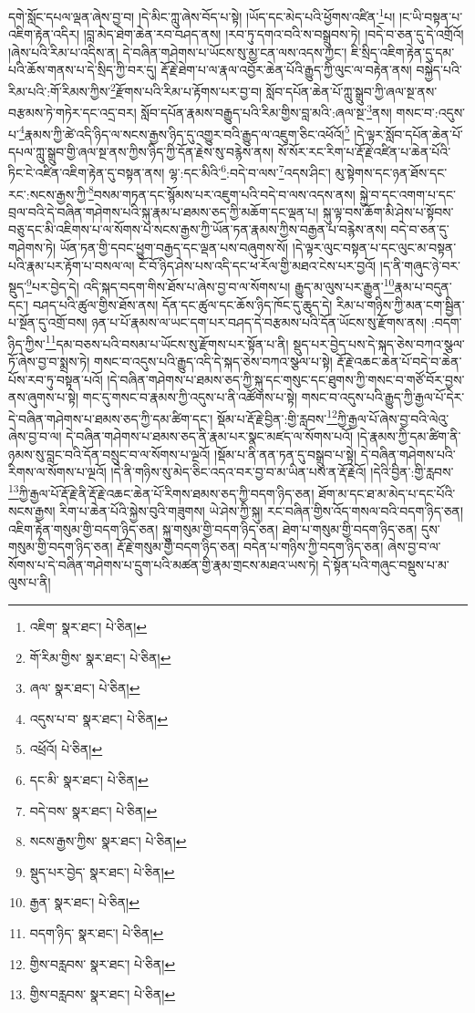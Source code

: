 དགེ་སློང་དཔལ་ལྡན་ཞེས་བྱ་བ། །དེ་མིང་ཀླུ་ཞེས་བོད་པ་སྟེ། །ཡོད་དང་མེད་པའི་ཕྱོགས་འཛིན་\footnote{འཇིག་  སྣར་ཐང་།  པེ་ཅིན། }པ། །ང་ཡི་བསྟན་པ་འཇིག་རྟེན་འདིར། །བླ་མེད་ཐེག་ཆེན་རབ་བཤད་ནས། །རབ་ཏུ་དགའ་བའི་ས་བསྒྲུབས་ཏེ། །བདེ་བ་ཅན་དུ་དེ་འགྲོའོ། །ཞེས་པའི་རིམ་པ་འདིས་ན། དེ་བཞིན་གཤེགས་པ་ཡོངས་སུ་མྱ་ངན་ལས་འདས་ཀྱང་། ཇི་སྲིད་འཇིག་རྟེན་དུ་དམ་པའི་ཆོས་གནས་པ་དེ་སྲིད་ཀྱི་བར་དུ། རྡོ་རྗེ་ཐེག་པ་ལ་རྣལ་འབྱོར་ཆེན་པོའི་རྒྱུད་ཀྱི་ལུང་ལ་བརྟེན་ནས། བསྐྱེད་པའི་རིམ་པའི་:གོ་རིམས་ཀྱིས་\footnote{གོ་རིམ་གྱིས་  སྣར་ཐང་།  པེ་ཅིན། }རྫོགས་པའི་རིམ་པ་རྟོགས་པར་བྱ་བ། སློབ་དཔོན་ཆེན་པོ་ཀླུ་སྒྲུབ་ཀྱི་ཞལ་སྔ་ནས་བརྩམས་ཏེ་གཏེར་དང་འདྲ་བར། སློབ་དཔོན་རྣམས་བརྒྱུད་པའི་རིམ་གྱིས་བླ་མའི་:ཞལ་སྔ་\footnote{ཞལ་  སྣར་ཐང་།  པེ་ཅིན། }ནས། གསང་བ་:འདུས་པ་\footnote{འདུས་པ་བ་  སྣར་ཐང་།  པེ་ཅིན། }རྣམས་ཀྱི་ཚེ་འདི་ཉིད་ལ་སངས་རྒྱས་ཉིད་དུ་འགྱུར་བའི་རྒྱུད་ལ་འཇུག་ཅིང་འཕོའོ།\footnote{འཕྲོའོ།  པེ་ཅིན། } །དེ་ལྟར་སློབ་དཔོན་ཆེན་པོ་དཔལ་ཀླུ་སྒྲུབ་གྱི་ཞལ་སྔ་ནས་ཀྱིས་ཉིད་ཀྱི་དོན་རྗེས་སུ་བརྙེས་ནས། སོ་སོར་རང་རིག་པ་རྡོ་རྗེ་འཛིན་པ་ཆེན་པོའི་ཏིང་ངེ་འཛིན་འཇིག་རྟེན་དུ་བསྟན་ནས། ལྷ་:དང་མིའི་\footnote{དང་མི་  སྣར་ཐང་།  པེ་ཅིན། }:བདེ་བ་ལས་\footnote{བདེ་བས་  སྣར་ཐང་།  པེ་ཅིན། }འདས་ཤིང་། མུ་སྟེགས་དང་ཉན་ཐོས་དང་རང་:སངས་རྒྱས་ཀྱི་\footnote{སངས་རྒྱས་ཀྱིས་  སྣར་ཐང་།  པེ་ཅིན། }བསམ་གཏན་དང་སྙོམས་པར་འཇུག་པའི་བདེ་བ་ལས་འདས་ནས། སྐྱེ་བ་དང་འགག་པ་དང་བྲལ་བའི་དེ་བཞིན་གཤེགས་པའི་སྐུ་རྣམ་པ་ཐམས་ཅད་ཀྱི་མཆོག་དང་ལྡན་པ། སྐུ་ལྟ་བས་ཆོག་མི་ཤེས་པ་སྟོབས་བཅུ་དང་མི་འཇིགས་པ་ལ་སོགས་པ་སངས་རྒྱས་ཀྱི་ཡོན་ཏན་རྣམས་ཀྱིས་བརྒྱན་པ་བརྙེས་ནས། བདེ་བ་ཅན་དུ་གཤེགས་ཏེ། ཡོན་ཏན་གྱི་དབང་ཕྱུག་བརྒྱད་དང་ལྡན་པས་བཞུགས་སོ། །དེ་ལྟར་ལུང་བསྟན་པ་དང་ལུང་མ་བསྟན་པའི་རྣམ་པར་རྟོག་པ་བསལ་ལ། ངོ་བོ་ཉིད་ཤེས་པས་འདི་དང་ཕ་རོལ་གྱི་མཐའ་ངེས་པར་བྱའོ། །ད་ནི་གཞུང་ཉེ་བར་སྡུད་\footnote{སྡུད་པར་བྱེད་  སྣར་ཐང་།  པེ་ཅིན། }པར་བྱེད་དེ། འདི་སྐད་བདག་གིས་ཐོས་པ་ཞེས་བྱ་བ་ལ་སོགས་པ། རྒྱུད་མ་ལུས་པར་རྒྱུན་\footnote{རྒྱན་  སྣར་ཐང་།  པེ་ཅིན། }རྣམ་པ་བདུན་དང་། བཤད་པའི་ཚུལ་གྱིས་ཐོས་ནས། དོན་དང་ཚུལ་དང་ཆོས་ཉིད་ཁོང་དུ་ཆུད་དེ། རིམ་པ་གཉིས་ཀྱི་མན་ངག་སྦྱིན་པ་སྔོན་དུ་འགྲོ་བས། ཉན་པ་པོ་རྣམས་ལ་ཡང་དག་པར་བཤད་དེ་བརྩམས་པའི་དོན་ཡོངས་སུ་རྫོགས་ནས། :བདག་ཉིད་ཀྱིས་\footnote{བདག་ཉིད་  སྣར་ཐང་།  པེ་ཅིན། }དམ་བཅས་པའི་བསམ་པ་ཡོངས་སུ་རྫོགས་པར་སྟོན་པ་ནི། སྡུད་པར་བྱེད་པས་དེ་སྐད་ཅེས་བཀའ་སྩལ་ཏོ་ཞེས་བྱ་བ་སྨྲས་ཏེ། གསང་བ་འདུས་པའི་རྒྱུད་འདི་དེ་སྐད་ཅེས་བཀའ་སྩལ་པ་སྟེ། རྡོ་རྗེ་འཆང་ཆེན་པོ་བདེ་བ་ཆེན་པོས་རབ་ཏུ་བསྟན་པའོ། །དེ་བཞིན་གཤེགས་པ་ཐམས་ཅད་ཀྱི་སྐུ་དང་གསུང་དང་ཐུགས་ཀྱི་གསང་བ་གཙོ་བོར་བྱས་ནས་ཞུགས་པ་སྟེ། གང་དུ་གསང་བ་རྣམས་ཀྱི་འདུས་པ་ནི་འཚོགས་པ་སྟེ། གསང་བ་འདུས་པའི་རྒྱུད་ཀྱི་རྒྱལ་པོ་དེར་དེ་བཞིན་གཤེགས་པ་ཐམས་ཅད་ཀྱི་དམ་ཚིག་དང་། སྡོམ་པ་རྡོ་རྗེ་བྱིན་:གྱི་རླབས་\footnote{གྱིས་བརླབས་  སྣར་ཐང་།  པེ་ཅིན། }ཀྱི་རྒྱལ་པོ་ཞེས་བྱ་བའི་ལེའུ་ཞེས་བྱ་བ་ལ། དེ་བཞིན་གཤེགས་པ་ཐམས་ཅད་ནི་རྣམ་པར་སྣང་མཛད་ལ་སོགས་པའོ། །དེ་རྣམས་ཀྱི་དམ་ཚིག་ནི་ཉམས་སུ་བླང་བའི་དོན་བསྲུང་བ་ལ་སོགས་པ་ལྔའོ། །སྡོམ་པ་ནི་ནན་ཏན་དུ་བསྒྲུབ་པ་སྟེ། དེ་བཞིན་གཤེགས་པའི་རིགས་ལ་སོགས་པ་ལྔའོ། །དེ་ནི་གཉིས་སུ་མེད་ཅིང་འདའ་བར་བྱ་བ་མ་ཡིན་པས་ན་རྡོ་རྗེའོ། །དེའི་བྱིན་:གྱི་རླབས་\footnote{གྱིས་བརླབས་  སྣར་ཐང་།  པེ་ཅིན། }ཀྱི་རྒྱལ་པོ་རྡོ་རྗེ་ནི་རྡོ་རྗེ་འཆང་ཆེན་པོ་རིགས་ཐམས་ཅད་ཀྱི་བདག་ཉིད་ཅན། ཐོག་མ་དང་ཐ་མ་མེད་པ་དང་པོའི་སངས་རྒྱས། རིག་པ་ཆེན་པོའི་སྐྱེས་བུའི་གཟུགས། ཡེ་ཤེས་ཀྱི་སྐུ། རང་བཞིན་གྱིས་འོད་གསལ་བའི་བདག་ཉིད་ཅན། འཇིག་རྟེན་གསུམ་གྱི་བདག་ཉིད་ཅན། སྐུ་གསུམ་གྱི་བདག་ཉིད་ཅན། ཐེག་པ་གསུམ་གྱི་བདག་ཉིད་ཅན། དུས་གསུམ་གྱི་བདག་ཉིད་ཅན། རྡོ་རྗེ་གསུམ་གྱི་བདག་ཉིད་ཅན། བདེན་པ་གཉིས་ཀྱི་བདག་ཉིད་ཅན། ཞེས་བྱ་བ་ལ་སོགས་པ་དེ་བཞིན་གཤེགས་པ་དྲུག་པའི་མཚན་གྱི་རྣམ་གྲངས་མཐའ་ཡས་ཏེ། དེ་སྟོན་པའི་གཞུང་བསྡུས་པ་མ་ལུས་པ་ནི། 